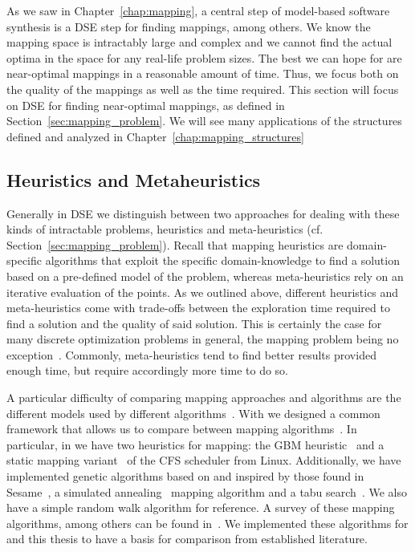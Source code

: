 As we saw in Chapter~\ref{chap:mapping}, a central step of model-based software synthesis is a \ac{DSE} step for finding mappings, among others.
We know the mapping space is intractably large and complex and we cannot find the actual optima in the space for any real-life problem sizes.
The best we can hope for are near-optimal mappings in a reasonable amount of time.
Thus, we focus both on the quality of the mappings as well as the time required.
This section will focus on \ac{DSE} for finding near-optimal mappings, as defined in Section~\ref{sec:mapping_problem}. 
We will see many applications of the structures defined and analyzed in Chapter~\ref{chap:mapping_structures}

\subsection{Heuristics and Metaheuristics}

Generally in \ac{DSE} we distinguish between two approaches for dealing with these kinds of intractable problems, heuristics and meta-heuristics (cf. Section~\ref{sec:mapping_problem}).
Recall that mapping heuristics are domain-specific algorithms that exploit the specific domain-knowledge to find a solution based on a pre-defined model of the problem, whereas meta-heuristics rely on an iterative evaluation of the points.
As we outlined above, different heuristics and meta-heuristics come with trade-offs between the exploration time required to find a solution and the quality of said solution.
This is certainly the case for many discrete optimization problems in general, the mapping problem being no exception~\cite{goens_mcsoc16}.
Commonly, meta-heuristics tend to find better results provided enough time, but require accordingly more time to do so.

A particular difficulty of comparing mapping approaches and algorithms are the different models used by different algorithms~\cite{goens_mcsoc16}.
With \mocasin we designed a common framework that allows us to compare between mapping algorithms~\cite{menard_rapido21}.
In particular, in \mocasin we have two heuristics for mapping: the \ac{GBM} heuristic~\cite{castrillon_dac12} and a static mapping variant~\cite{menard_rapido21} of the \ac{CFS} scheduler from Linux.
Additionally, we have implemented genetic algorithms based on and inspired by those found in Sesame~\cite{erbas2006multiobjective,quan2014towards,goens_mcsoc16}, a simulated annealing~\cite{simulated_annealing} mapping algorithm and a tabu search~\cite{tabu_search}.
We also have a simple random walk algorithm for reference.
A survey of these mapping algorithms, among others can be found in~\cite{singh2013mapping}.
We implemented these algorithms for \mocasin and this thesis to have a basis for comparison from established literature.

